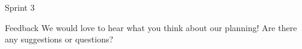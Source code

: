 \begin{frame}[t]{Sprint 3}

\end{frame}

\begin{frame}[t]{Feedback}
We would love to hear what you think about our planning! Are there any suggestions or questions?
\end{frame}
